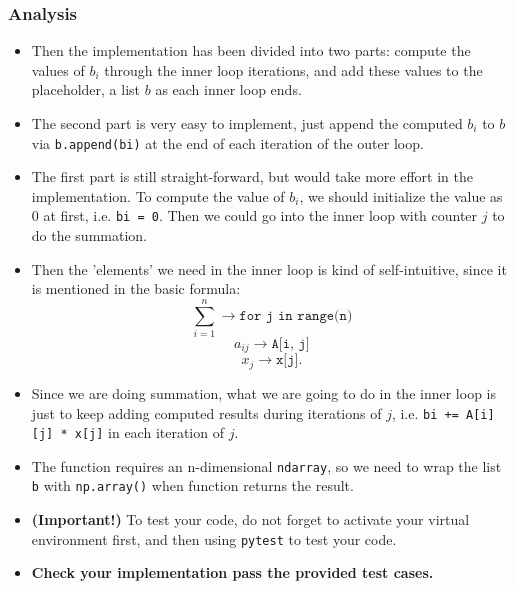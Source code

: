 \subsubsection*{Analysis}
    \begin{itemize}
    \item Then the implementation has been divided into two parts: compute the values of $b_i$ through the inner loop iterations, and add these values to the placeholder, a list $b$ as each inner loop ends.
    \item The second part is very easy to implement, just append the computed $b_i$ to $b$ via \texttt{b.append(bi)} at the end of each iteration of the outer loop.
    \item The first part is still straight-forward, but would take more effort in the implementation. To compute the value of $b_i$, we should initialize the value as 0 at first, i.e. \texttt{bi = 0}. Then we could go into the inner loop with counter $j$ to do the summation. 
    \item Then the 'elements' we need in the inner loop is kind of self-intuitive, since it is mentioned in the basic formula:
      \[
        \sum_{i = 1}^{n} \to \texttt{for j in range(n)}
      \] 
       \[
         a_{ij} \to  \texttt{A[i, j]}
      \] 
      \[
        x_j \to  \texttt{x[j]}
      .\]     
    \item Since we are doing summation, what we are going to do in the inner loop is just to keep adding computed results during iterations of $j$, i.e.  \texttt{bi += A[i][j] * x[j]} in each iteration of $j$.
    \item The function requires an n-dimensional \texttt{ndarray}, so we need to wrap the list \texttt{b} with \texttt{np.array()} when function returns the result.
    \item \textbf{(Important!)} To test your code, do not forget to activate your virtual environment first, and then using \texttt{pytest} to test your code.
    \item \textbf{Check your implementation pass the provided test cases.}
  \end{itemize}
%       
